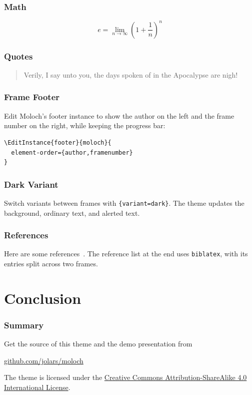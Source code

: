\documentclass[10pt,aspect-ratio=4:3]{ltx-talk}
\begin{document}
\begin{frame}
  \frametitle{Math}
  \begin{equation*}
    e = \lim_{n\to\infty} \left(1 + \frac{1}{n}\right)^n
  \end{equation*}
\end{frame}

\begin{frame}
  \frametitle{Quotes}
  \begin{quote}
    Verily, I say unto you, the days spoken of in the Apocalypse are nigh!
  \end{quote}
\end{frame}

{
\begin{frame*}
  \frametitle{Frame Footer}
  Edit Moloch's footer instance to show the author on the left and the frame
  number on the right, while keeping the progress bar:
  \begin{verbatim}
\EditInstance{footer}{moloch}{
  element-order={author,framenumber}
}
  \end{verbatim}
\end{frame*}
}

\begin{frame}
  \frametitle{Dark Variant}
  Switch variants between frames with \texttt{\string\molochset\{variant=dark\}}.
  The theme updates the background, ordinary text, and \alert{alerted text}.
\end{frame}

\begin{frame}
  \frametitle{References}
  Here are some references~\cite{Knuth92,ConcreteMath,Simpson,Er01,greenwade93}.
  The reference list at the end uses \texttt{biblatex}, with its entries split
  across two frames.
\end{frame}

\section{Conclusion}

\begin{frame}
  \frametitle{Summary}
  Get the source of this theme and the demo presentation from
  \begin{center}
    \url{github.com/jolars/moloch}
  \end{center}

  The theme is licensed under the
  \href{https://creativecommons.org/licenses/by-sa/4.0/}{Creative Commons
    Attribution-ShareAlike 4.0 International License}.
\end{frame}
\end{document}
